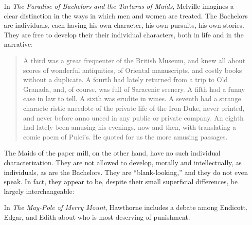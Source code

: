 \documentclass[man,12pt,natbib]{apa6}
\begin{document}
In \emph{The Paradise of Bachelors and the Tartarus of Maids}, Melville
imagines a clear distinction in the ways in which men and women are treated.
The Bachelors are individuals, each having his own character, his own pursuits,
his own stories. They are free to develop their their individual characters,
both in life and in the narrative:
\begin{quote}
	A third was a great frequenter of the British Museum, and knew all about
	scores of wonderful antiquities, of Oriental manuscripts, and costly books
	without a duplicate.  A fourth had lately returned from a trip to Old
	Granada, and, of course, was full of Saracenic scenery. A fifth had a funny
	case in law to tell. A sixth was erudite in wines. A seventh had a strange
	characte ristic anecdote of the private life of the Iron Duke, never
	printed, and never before anno unced in any public or private company. An
	eighth had lately been amusing his evenings, now and then, with translating
	a comic poem of Pulci's. He quoted for us the more amusing passages. 
\end{quote}

The Maids of the paper mill, on the other hand, have no such individual
characterization. They are not allowed to develop, morally and intellectually,
as individuals, as are the Bachelors. They are ``blank-looking,'' and they do
not even speak. In fact, they appear to be, despite their small superficial differences, be largely interchangeable:
\begin{quote}

\end{quote}

In \emph{The May-Pole of Merry Mount}, Hawthorne includes a debate among
Endicott, Edgar, and Edith about who is most deserving of punishment.

\nocite{Child12b, Melville12, Poe12b}

\clearpage

\end{document}
